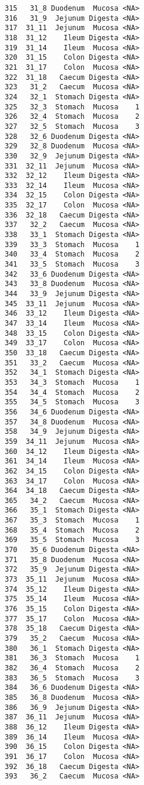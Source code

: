 \documentclass[
  letterpaper,
  DIV=11,
  numbers=noendperiod]{scrartcl}
\begin{document}
\begin{verbatim}
315   31_8 Duodenum  Mucosa <NA>
316   31_9  Jejunum Digesta <NA>
317  31_11  Jejunum  Mucosa <NA>
318  31_12    Ileum Digesta <NA>
319  31_14    Ileum  Mucosa <NA>
320  31_15    Colon Digesta <NA>
321  31_17    Colon  Mucosa <NA>
322  31_18   Caecum Digesta <NA>
323   31_2   Caecum  Mucosa <NA>
324   32_1  Stomach Digesta <NA>
325   32_3  Stomach  Mucosa    1
326   32_4  Stomach  Mucosa    2
327   32_5  Stomach  Mucosa    3
328   32_6 Duodenum Digesta <NA>
329   32_8 Duodenum  Mucosa <NA>
330   32_9  Jejunum Digesta <NA>
331  32_11  Jejunum  Mucosa <NA>
332  32_12    Ileum Digesta <NA>
333  32_14    Ileum  Mucosa <NA>
334  32_15    Colon Digesta <NA>
335  32_17    Colon  Mucosa <NA>
336  32_18   Caecum Digesta <NA>
337   32_2   Caecum  Mucosa <NA>
338   33_1  Stomach Digesta <NA>
339   33_3  Stomach  Mucosa    1
340   33_4  Stomach  Mucosa    2
341   33_5  Stomach  Mucosa    3
342   33_6 Duodenum Digesta <NA>
343   33_8 Duodenum  Mucosa <NA>
344   33_9  Jejunum Digesta <NA>
345  33_11  Jejunum  Mucosa <NA>
346  33_12    Ileum Digesta <NA>
347  33_14    Ileum  Mucosa <NA>
348  33_15    Colon Digesta <NA>
349  33_17    Colon  Mucosa <NA>
350  33_18   Caecum Digesta <NA>
351   33_2   Caecum  Mucosa <NA>
352   34_1  Stomach Digesta <NA>
353   34_3  Stomach  Mucosa    1
354   34_4  Stomach  Mucosa    2
355   34_5  Stomach  Mucosa    3
356   34_6 Duodenum Digesta <NA>
357   34_8 Duodenum  Mucosa <NA>
358   34_9  Jejunum Digesta <NA>
359  34_11  Jejunum  Mucosa <NA>
360  34_12    Ileum Digesta <NA>
361  34_14    Ileum  Mucosa <NA>
362  34_15    Colon Digesta <NA>
363  34_17    Colon  Mucosa <NA>
364  34_18   Caecum Digesta <NA>
365   34_2   Caecum  Mucosa <NA>
366   35_1  Stomach Digesta <NA>
367   35_3  Stomach  Mucosa    1
368   35_4  Stomach  Mucosa    2
369   35_5  Stomach  Mucosa    3
370   35_6 Duodenum Digesta <NA>
371   35_8 Duodenum  Mucosa <NA>
372   35_9  Jejunum Digesta <NA>
373  35_11  Jejunum  Mucosa <NA>
374  35_12    Ileum Digesta <NA>
375  35_14    Ileum  Mucosa <NA>
376  35_15    Colon Digesta <NA>
377  35_17    Colon  Mucosa <NA>
378  35_18   Caecum Digesta <NA>
379   35_2   Caecum  Mucosa <NA>
380   36_1  Stomach Digesta <NA>
381   36_3  Stomach  Mucosa    1
382   36_4  Stomach  Mucosa    2
383   36_5  Stomach  Mucosa    3
384   36_6 Duodenum Digesta <NA>
385   36_8 Duodenum  Mucosa <NA>
386   36_9  Jejunum Digesta <NA>
387  36_11  Jejunum  Mucosa <NA>
388  36_12    Ileum Digesta <NA>
389  36_14    Ileum  Mucosa <NA>
390  36_15    Colon Digesta <NA>
391  36_17    Colon  Mucosa <NA>
392  36_18   Caecum Digesta <NA>
393   36_2   Caecum  Mucosa <NA>

\end{verbatim}
\end{document}
